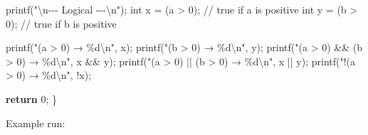\documentclass[
  letterpaper,
  DIV=11,
  numbers=noendperiod]{scrreprt}
\newenvironment{Shaded}{\begin{snugshade}}{\end{snugshade}}
\newcommand{\CommentTok}[1]{\textcolor[rgb]{0.37,0.37,0.37}{#1}}
\newcommand{\ControlFlowTok}[1]{\textcolor[rgb]{0.00,0.23,0.31}{\textbf{#1}}}
\newcommand{\DataTypeTok}[1]{\textcolor[rgb]{0.68,0.00,0.00}{#1}}
\newcommand{\DecValTok}[1]{\textcolor[rgb]{0.68,0.00,0.00}{#1}}
\newcommand{\NormalTok}[1]{\textcolor[rgb]{0.00,0.23,0.31}{#1}}
\newcommand{\OperatorTok}[1]{\textcolor[rgb]{0.37,0.37,0.37}{#1}}
\newcommand{\SpecialCharTok}[1]{\textcolor[rgb]{0.37,0.37,0.37}{#1}}
\newcommand{\StringTok}[1]{\textcolor[rgb]{0.13,0.47,0.30}{#1}}
\begin{document}
\begin{Shaded}
\begin{Highlighting}[]
\NormalTok{    printf}\OperatorTok{(}\StringTok{"}\SpecialCharTok{\textbackslash{}n}\StringTok{{-}{-}{-} Logical {-}{-}{-}}\SpecialCharTok{\textbackslash{}n}\StringTok{"}\OperatorTok{);}
    \DataTypeTok{int}\NormalTok{ x }\OperatorTok{=} \OperatorTok{(}\NormalTok{a }\OperatorTok{\textgreater{}} \DecValTok{0}\OperatorTok{);}  \CommentTok{// true if a is positive}
    \DataTypeTok{int}\NormalTok{ y }\OperatorTok{=} \OperatorTok{(}\NormalTok{b }\OperatorTok{\textgreater{}} \DecValTok{0}\OperatorTok{);}  \CommentTok{// true if b is positive}

\NormalTok{    printf}\OperatorTok{(}\StringTok{"(a \textgreater{} 0) → }\SpecialCharTok{\%d\textbackslash{}n}\StringTok{"}\OperatorTok{,}\NormalTok{ x}\OperatorTok{);}
\NormalTok{    printf}\OperatorTok{(}\StringTok{"(b \textgreater{} 0) → }\SpecialCharTok{\%d\textbackslash{}n}\StringTok{"}\OperatorTok{,}\NormalTok{ y}\OperatorTok{);}
\NormalTok{    printf}\OperatorTok{(}\StringTok{"(a \textgreater{} 0) \&\& (b \textgreater{} 0) → }\SpecialCharTok{\%d\textbackslash{}n}\StringTok{"}\OperatorTok{,}\NormalTok{ x }\OperatorTok{\&\&}\NormalTok{ y}\OperatorTok{);}
\NormalTok{    printf}\OperatorTok{(}\StringTok{"(a \textgreater{} 0) || (b \textgreater{} 0) → }\SpecialCharTok{\%d\textbackslash{}n}\StringTok{"}\OperatorTok{,}\NormalTok{ x }\OperatorTok{||}\NormalTok{ y}\OperatorTok{);}
\NormalTok{    printf}\OperatorTok{(}\StringTok{"!(a \textgreater{} 0) → }\SpecialCharTok{\%d\textbackslash{}n}\StringTok{"}\OperatorTok{,} \OperatorTok{!}\NormalTok{x}\OperatorTok{);}

    \ControlFlowTok{return} \DecValTok{0}\OperatorTok{;}
\OperatorTok{\}}
\end{Highlighting}
\end{Shaded}

Example run:
\end{document}
